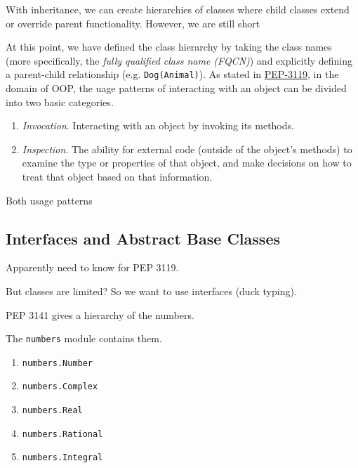   With inheritance, we can create hierarchies of classes where child classes extend or override parent functionality. However, we are still short 

  At this point, we have defined the class hierarchy by taking the class names (more specifically, the \textit{fully qualified class name (FQCN)}) and explicitly defining a parent-child relationship (e.g. \texttt{Dog(Animal)}). As stated in \href{https://peps.python.org/pep-3119/}{PEP-3119}, in the domain of OOP, the uage patterns of interacting with an object can be divided into two basic categories. 
  \begin{enumerate}
    \item \textit{Invocation}. Interacting with an object by invoking its methods. 
    \item \textit{Inspection}. The ability for external code (outside of the object's methods) to examine the type or properties of that object, and make decisions on how to treat that object based on that information. 
  \end{enumerate}
  Both usage patterns 

\subsection{Interfaces and Abstract Base Classes} 

  Apparently need to know for PEP 3119. 

  But classes are limited? So we want to use interfaces (duck typing). 


  PEP 3141 gives a hierarchy of the numbers. 

  \begin{definition} 
    The \texttt{numbers} module contains them. 
    \begin{enumerate}
      \item \texttt{numbers.Number} 
      \item \texttt{numbers.Complex} 
      \item \texttt{numbers.Real} 
      \item \texttt{numbers.Rational} 
      \item \texttt{numbers.Integral} 
    \end{enumerate}
  \end{definition}


